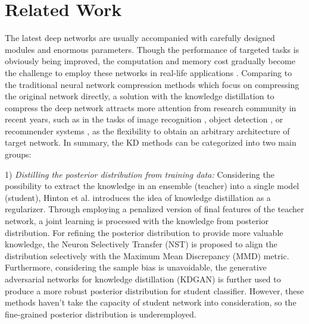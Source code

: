 \documentclass[10pt,twocolumn,letterpaper]{article}
\begin{document}
\section{Related Work}

The latest deep networks are usually accompanied with
carefully designed modules \cite{denseNet2017, he2016deep}
and enormous parameters.
Though the performance of targeted tasks is obviously being improved,
the computation and memory cost gradually become the challenge
to employ these networks
in real-life applications \cite{jacob2018quantization, Shen2018Towards}.
Comparing to the traditional neural network compression methods \cite{cheng2017survey}
which focus on compressing the original network directly,
a solution with the knowledge distillation
to compress the deep network attracts more attention from research community in recent years,
such as in the tasks of image recognition \cite{yim2017gift},
object detection \cite{GuobinChen_2017_NIPS, luo2016face},
or recommender systems \cite{Guorui_2018_AAAI},
as the flexibility to obtain an arbitrary architecture of target network.
In summary,
the KD methods can be categorized into two main groups:

1) \emph{Distilling the posterior distribution from training data:}
Considering the possibility to extract the knowledge
in an ensemble (teacher) into a single model (student),
Hinton et al. \cite{Hinton2015Distilling} introduces
the idea of knowledge distillation as a regularizer.
Through employing a penalized version \cite{BSS2019, huang2018data, zheng2017CKD}
of final features of the teacher network,
a joint learning is processed with the knowledge from posterior distribution.
For refining the posterior distribution to
provide more valuable knowledge,
the Neuron Selectively Transfer (NST) \cite{huang2017like} is proposed to
align the distribution selectively with the Maximum Mean Discrepancy (MMD) metric.
Furthermore,
considering the sample bias is unavoidable,
the generative adversarial networks for knowledge distillation (KDGAN) \cite{wang2018kdgan}
is further used to produce a more robust posterior distribution for student classifier.
However,
these methods haven't take the capacity of student network into consideration,
so the fine-grained posterior distribution is underemployed.
\end{document}
